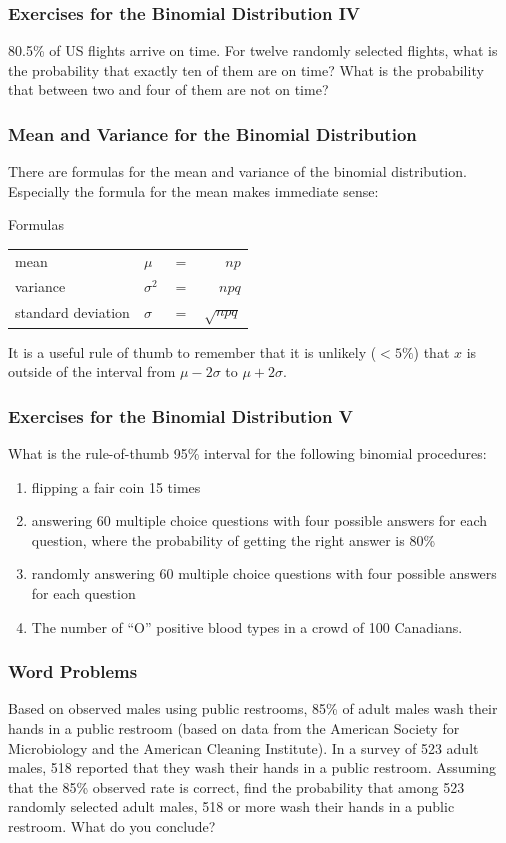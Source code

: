 \documentclass[xcolor=dvipsnames]{beamer}
\begin{document}
\begin{frame}
  \frametitle{Exercises for the Binomial Distribution IV}
  {\ubung} 80.5\% of US flights arrive on time. For twelve randomly
  selected flights, what is the probability that exactly ten of them
  are on time? What is the probability that between two and four of
  them are not on time?
\end{frame}

\begin{frame}
  \frametitle{Mean and Variance for the Binomial Distribution}
There are formulas for the mean and variance of the binomial
distribution. Especially the formula for the mean makes immediate
sense:
\begin{block}{Formulas}
  \begin{tabular}{llcr}
  mean& $\mu$&$=$&$np$ \\ 
  variance& $\sigma^{2}$&$=$&$npq$ \\
  standard deviation& $\sigma$&$=$&$\sqrt{npq}$
  \end{tabular}
\end{block}
It is a useful rule of thumb to remember that it is unlikely ($<5\%$)
that $x$ is outside of the interval from $\mu-2\sigma$ to
$\mu+2\sigma$.
\end{frame}

\begin{frame}
  \frametitle{Exercises for the Binomial Distribution V}
  {\ubung} What is the rule-of-thumb 95\% interval for the following
  binomial procedures:
  \begin{enumerate}
\item<1-> flipping a fair coin 15 times
\item<2-> answering 60 multiple choice questions with four possible
  answers for each question, where the probability of getting the right answer is 80\%
\item<3-> randomly answering 60 multiple choice questions with four
  possible answers for each question
\item<4-> The number of ``O'' positive blood types in a crowd of 100 Canadians.
  \end{enumerate}
\end{frame}

\begin{frame}
  \frametitle{Word Problems}
  {\ubung} Based on observed males using public restrooms, 85\% of
  adult males wash their hands in a public restroom (based on data
  from the American Society for Microbiology and the American Cleaning
  Institute). In a survey of 523 adult males, 518 reported that they
  wash their hands in a public restroom. Assuming that the 85\%
  observed rate is correct, find the probability that among 523
  randomly selected adult males, 518 or more wash their hands in a
  public restroom. What do you conclude?
\end{frame}
\end{document}
